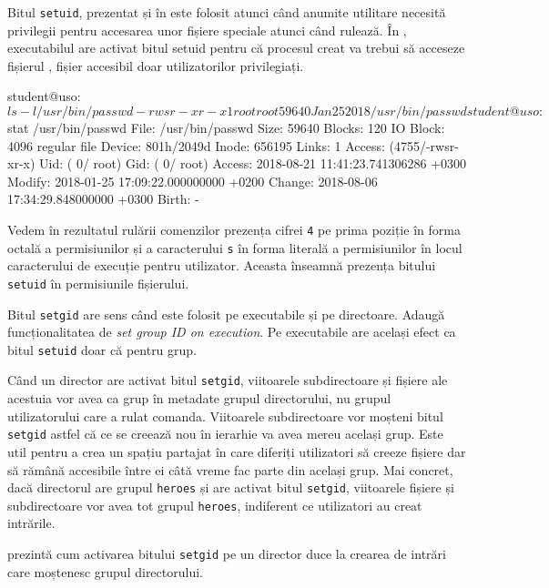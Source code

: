 Bitul \texttt{setuid}, prezentat și în  este folosit atunci când anumite utilitare necesită privilegii
pentru accesarea unor fișiere speciale atunci când rulează. În ,
executabilul  are activat bitul setuid pentru că procesul creat
va trebui să acceseze fișierul , fișier accesibil doar utilizatorilor
privilegiați.

\begin{screen}[caption={Folosirea bitului setuid},label={lst:user:use-setuid}]
student@uso:~$ ls -l /usr/bin/passwd
-rwsr-xr-x 1 root root 59640 Jan 25  2018 /usr/bin/passwd
student@uso:~$ stat /usr/bin/passwd
  File: /usr/bin/passwd
  Size: 59640             Blocks: 120        IO Block: 4096   regular file
Device: 801h/2049d        Inode: 656195      Links: 1
Access: (4755/-rwsr-xr-x)  Uid: (    0/    root)   Gid: (    0/    root)
Access: 2018-08-21 11:41:23.741306286 +0300
Modify: 2018-01-25 17:09:22.000000000 +0200
Change: 2018-08-06 17:34:29.848000000 +0300
 Birth: -
\end{screen}

Vedem în rezultatul rulării comenzilor prezența cifrei \texttt{4} pe prima poziție în forma octală a
permisiunilor și a caracterului \texttt{s} în forma literală a permisiunilor în locul
caracterului de execuție pentru utilizator. Aceasta înseamnă prezența bitului \texttt{setuid} în permisiunile fișierului.

Bitul \texttt{setgid} are sens când este folosit pe executabile și pe directoare. Adaugă
funcționalitatea de \textit{set group ID on execution}. Pe executabile are
același efect ca bitul \texttt{setuid} doar că pentru grup.

Când un director are activat bitul \texttt{setgid}, viitoarele subdirectoare și fișiere ale
acestuia vor avea ca grup în metadate grupul directorului, nu grupul
utilizatorului care a rulat comanda. Viitoarele subdirectoare vor moșteni bitul
\texttt{setgid} astfel că ce se creează nou în ierarhie va avea mereu același grup. Este
util pentru a crea un spațiu partajat în care diferiți utilizatori să creeze
fișiere dar să rămână accesibile între ei câtă vreme fac parte din același grup.
Mai concret, dacă directorul  are grupul \texttt{heroes} și are activat bitul
\texttt{setgid}, viitoarele fișiere și subdirectoare vor avea tot grupul \texttt{heroes},
indiferent ce utilizatori au creat intrările.

 prezintă cum activarea bitului \texttt{setgid} pe un director duce
la crearea de intrări care moștenesc grupul directorului.

